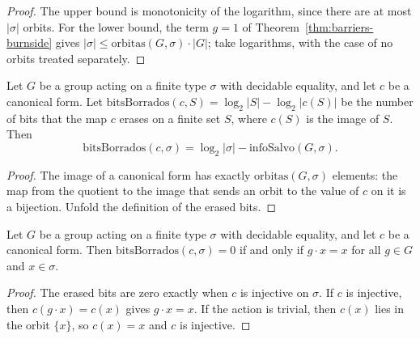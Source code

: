 \begin{proof}
  \leanok
  The upper bound is monotonicity of the logarithm, since there are at most $|\sigma|$ orbits. For
  the lower bound, the term $g = 1$ of Theorem~\ref{thm:barriers-burnside} gives $|\sigma| \le
  \mathrm{orbitas}(G, \sigma) \cdot |G|$; take logarithms, with the case of no orbits treated
  separately.
\end{proof}

\begin{theorem}
  \label{thm:barriers-canonica-borra}
  \leanok
  Let $G$ be a group acting on a finite type $\sigma$ with decidable equality, and let $c$ be a
  canonical form. Let $\mathrm{bitsBorrados}(c, S) = \log_2 |S| - \log_2 |c(S)|$ be the number of
  bits that the map $c$ erases on a finite set $S$, where $c(S)$ is the image of $S$. Then
  \[
    \mathrm{bitsBorrados}(c, \sigma) = \log_2 |\sigma| - \mathrm{infoSalvo}(G, \sigma) .
  \]
  \own{}
\end{theorem}

\begin{proof}
  \leanok
  The image of a canonical form has exactly $\mathrm{orbitas}(G, \sigma)$ elements: the map
  from the quotient to the image that sends an orbit to the value of $c$ on it is a bijection.
  Unfold the definition of the erased bits.
\end{proof}

\begin{theorem}
  \label{thm:barriers-canonica-no-borra}
  \leanok
  Let $G$ be a group acting on a finite type $\sigma$ with decidable equality, and let $c$ be a
  canonical form. Then $\mathrm{bitsBorrados}(c, \sigma) = 0$ if and only if $g \cdot x = x$ for all
  $g \in G$ and $x \in \sigma$.
  \own{}
\end{theorem}

\begin{proof}
  \leanok
  The erased bits are zero exactly when $c$ is injective on $\sigma$. If $c$ is injective, then
  $c(g \cdot x) = c(x)$ gives $g \cdot x = x$. If the action is trivial, then $c(x)$ lies in the
  orbit $\{x\}$, so $c(x) = x$ and $c$ is injective.
\end{proof}

